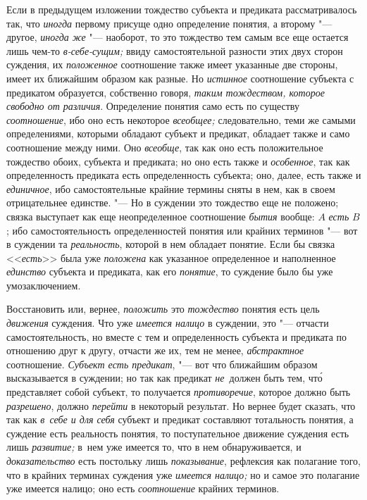 Если в предыдущем изложении тождество субъекта и предиката рассматривалось так,
что {\em иногда} первому присуще одно определение понятия,
а второму "--- другое, {\em иногда же} "--- наоборот, то это тождество тем
самым все еще остается лишь чем-то {\em в-себе-сущим;} ввиду самостоятельной
разности этих двух сторон суждения, их {\em положенное} соотношение также имеет
указанные две стороны, имеет их ближайшим образом как разные. Но {\em истинное}
соотношение субъекта с предикатом образуется, собственно говоря,
{\em таким тождеством, которое свободно от различия}. Определение понятия само
есть по существу {\em соотношение}, ибо оно есть некоторое {\em всеобщее;}
следовательно, теми же самыми определениями, которыми обладают субъект и
предикат, обладает также и само соотношение между ними. Оно {\em всеобще},
так как оно есть положительное тождество обоих, субъекта и предиката; но оно
есть также и {\em особенное},
так как определенность предиката есть определенность субъекта; оно, далее, есть
также и {\em единичное}, ибо самостоятельные крайние термины сняты в нем, как
в своем отрицательнее единстве. "--- Но в суждении это тождество еще не
положено; связка выступает как еще неопределенное соотношение {\em бытия}
вообще: $A$ {\em есть} $B$; ибо самостоятельность определенностей понятия или
крайних терминов "--- вот в суждении та {\em реальность}, которой в нем
обладает понятие. Если бы связка <<{\em есть}>> была уже {\em положена} как
указанное определенное и наполненное {\em единство} субъекта и предиката, как
его {\em понятие}, то суждение было бы уже умозаключением.

Восстановить или, вернее, {\em положить} это {\em тождество} понятия есть цель
{\em движения} суждения. Что уже {\em имеется налицо} в суждении,
это "--- отчасти самостоятельность, но вместе с тем и
определенность субъекта и предиката по отношению друг к другу, отчасти же
их, тем не менее, {\em абстрактное} соотношение.
{\em Субъект есть предикат}, "--- вот что ближайшим образом высказывается в
суждении; но так как предикат {\em не}~должен быть тем, чт\'{о}
представляет собой субъект, то получается {\em противоречие}, которое должно
быть {\em разрешено}, должно {\em перейти} в некоторый результат. Но вернее
будет сказать, что так как {\em в~себе и для себя} субъект и предикат
составляют тотальность понятия, а суждение есть реальность понятия, то
поступательное движение суждения есть лишь {\em развитие;} в~нем уже
имеется то, что в нем обнаруживается, и {\em доказательство} есть
постольку лишь {\em показывание}, рефлексия как полагание того, что в крайних
терминах суждения уже {\em имеется налицо;} но и самое это полагание уже
имеется налицо; оно есть {\em соотношение} крайних терминов.

